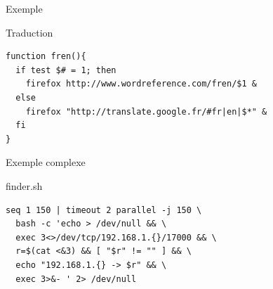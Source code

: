 \documentclass{beamer}
\begin{document}
\begin{frame}[fragile]{Exemple}
\begin{block}{Traduction}
\begin{verbatim}
function fren(){
  if test $# = 1; then
    firefox http://www.wordreference.com/fren/$1 &
  else
    firefox "http://translate.google.fr/#fr|en|$*" &
  fi
}
\end{verbatim}
\end{block}
\end{frame}

\begin{frame}[fragile]{Exemple complexe}
\begin{block}{finder.sh}
\begin{verbatim}
seq 1 150 | timeout 2 parallel -j 150 \
  bash -c 'echo > /dev/null && \
  exec 3<>/dev/tcp/192.168.1.{}/17000 && \
  r=$(cat <&3) && [ "$r" != "" ] && \
  echo "192.168.1.{} -> $r" && \
  exec 3>&- ' 2> /dev/null
\end{verbatim}
\end{block}
\end{frame}


\end{document}
